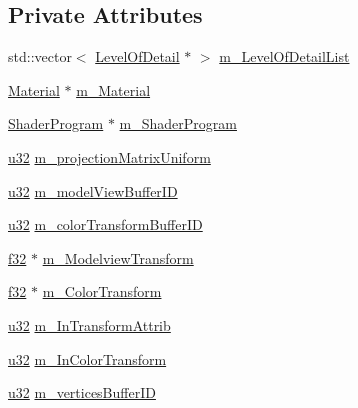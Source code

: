 \subsection*{Private Attributes}
\begin{DoxyCompactItemize}
\item 
std\+::vector$<$ \mbox{\hyperlink{classnjli_1_1_level_of_detail}{Level\+Of\+Detail}} $\ast$ $>$ \mbox{\hyperlink{classnjli_1_1_geometry_aadc21c7eaa17ae0bd48895e0b805e926}{m\+\_\+\+Level\+Of\+Detail\+List}}
\item 
\mbox{\hyperlink{classnjli_1_1_material}{Material}} $\ast$ \mbox{\hyperlink{classnjli_1_1_geometry_ab2ba0f4fa336c12174fcac949df5fee3}{m\+\_\+\+Material}}
\item 
\mbox{\hyperlink{classnjli_1_1_shader_program}{Shader\+Program}} $\ast$ \mbox{\hyperlink{classnjli_1_1_geometry_a28fe075abe7471aee4eff56e0b1389c3}{m\+\_\+\+Shader\+Program}}
\item 
\mbox{\hyperlink{_util_8h_a10e94b422ef0c20dcdec20d31a1f5049}{u32}} \mbox{\hyperlink{classnjli_1_1_geometry_aa8e22217dcfbcb465395971bef71453c}{m\+\_\+projection\+Matrix\+Uniform}}
\item 
\mbox{\hyperlink{_util_8h_a10e94b422ef0c20dcdec20d31a1f5049}{u32}} \mbox{\hyperlink{classnjli_1_1_geometry_a0a9f224dd899fe90b27c6da5cafe6489}{m\+\_\+model\+View\+Buffer\+ID}}
\item 
\mbox{\hyperlink{_util_8h_a10e94b422ef0c20dcdec20d31a1f5049}{u32}} \mbox{\hyperlink{classnjli_1_1_geometry_aae71a91b509b2535d0037a6be4bc3e2d}{m\+\_\+color\+Transform\+Buffer\+ID}}
\item 
\mbox{\hyperlink{_util_8h_a5f6906312a689f27d70e9d086649d3fd}{f32}} $\ast$ \mbox{\hyperlink{classnjli_1_1_geometry_ab544bc75aee1731a0bfe0f107eaf4044}{m\+\_\+\+Modelview\+Transform}}
\item 
\mbox{\hyperlink{_util_8h_a5f6906312a689f27d70e9d086649d3fd}{f32}} $\ast$ \mbox{\hyperlink{classnjli_1_1_geometry_a261359d21a4f86f5335975197372e183}{m\+\_\+\+Color\+Transform}}
\item 
\mbox{\hyperlink{_util_8h_a10e94b422ef0c20dcdec20d31a1f5049}{u32}} \mbox{\hyperlink{classnjli_1_1_geometry_ab3c31621e11c227991a764b3dcd8d7b2}{m\+\_\+\+In\+Transform\+Attrib}}
\item 
\mbox{\hyperlink{_util_8h_a10e94b422ef0c20dcdec20d31a1f5049}{u32}} \mbox{\hyperlink{classnjli_1_1_geometry_a92e00e8041964fbec6273971bde5c80d}{m\+\_\+\+In\+Color\+Transform}}
\item 
\mbox{\hyperlink{_util_8h_a10e94b422ef0c20dcdec20d31a1f5049}{u32}} \mbox{\hyperlink{classnjli_1_1_geometry_a0cb9201bc685871f14a28e5ab3ad3ece}{m\+\_\+vertices\+Buffer\+ID}}

\end{DoxyCompactItemize}
